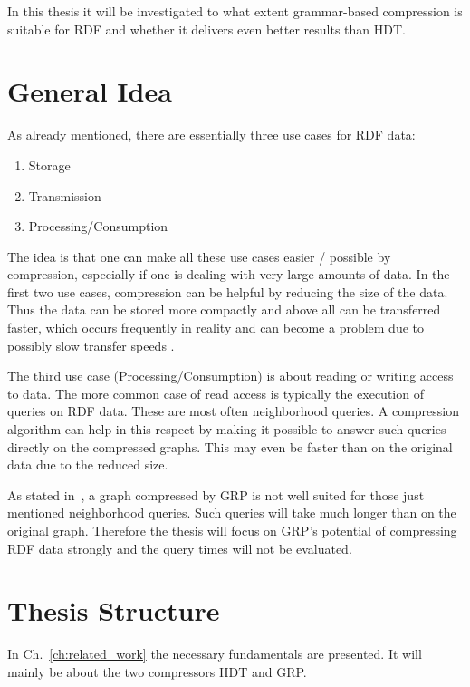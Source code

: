 In this thesis it will be investigated to what extent grammar-based compression is suitable for RDF and whether it delivers even better results than HDT.


\section{General Idea}

As already mentioned, there are essentially three use cases for RDF data:

\begin{enumerate}
	\item Storage
	\item Transmission
	\item Processing/Consumption
\end{enumerate}

The idea is that one can make all these use cases easier / possible by compression, especially if one is dealing with very large amounts of data. In the first two use cases, compression can be helpful by reducing the size of the data. Thus the data can be stored more compactly and above all can be transferred faster, which occurs frequently in reality and can become a problem due to possibly slow transfer speeds .

The third use case (Processing/Consumption) is about reading or writing access to data. The more common case of read access is typically the execution of queries on RDF data. These are most often neighborhood queries. A compression algorithm can help in this respect by making it possible to answer such queries directly on the compressed graphs. This may even be faster than on the original data due to the reduced size.

As stated in~\cite{maneth}, a graph compressed by GRP is not well suited for those just mentioned neighborhood queries. Such queries will take much longer than on the original graph. Therefore the thesis will focus on GRP's potential of compressing RDF data strongly and the query times will not be evaluated.



\section{Thesis Structure}

In Ch.~\ref{ch:related_work} the necessary fundamentals are presented. It will mainly be about the two compressors HDT and GRP. 

